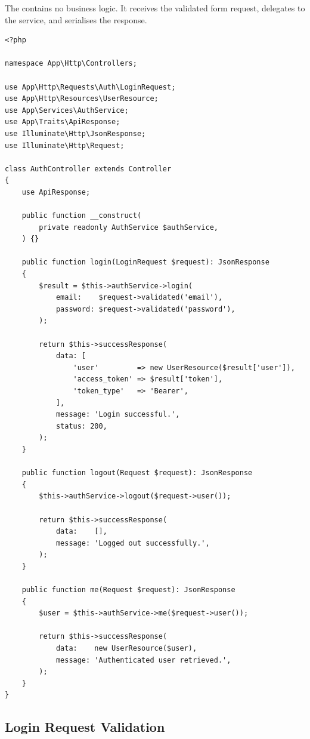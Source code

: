 The  contains no business logic. It receives
the validated form request, delegates to the service, and serialises the
response.

\begin{lstlisting}[style=php, caption={\texttt{app/Http/Controllers/AuthController.php}
  --- Thin controller delegating entirely to \phpclass{AuthService}.}]
<?php

namespace App\Http\Controllers;

use App\Http\Requests\Auth\LoginRequest;
use App\Http\Resources\UserResource;
use App\Services\AuthService;
use App\Traits\ApiResponse;
use Illuminate\Http\JsonResponse;
use Illuminate\Http\Request;

class AuthController extends Controller
{
    use ApiResponse;

    public function __construct(
        private readonly AuthService $authService,
    ) {}

    public function login(LoginRequest $request): JsonResponse
    {
        $result = $this->authService->login(
            email:    $request->validated('email'),
            password: $request->validated('password'),
        );

        return $this->successResponse(
            data: [
                'user'         => new UserResource($result['user']),
                'access_token' => $result['token'],
                'token_type'   => 'Bearer',
            ],
            message: 'Login successful.',
            status: 200,
        );
    }

    public function logout(Request $request): JsonResponse
    {
        $this->authService->logout($request->user());

        return $this->successResponse(
            data:    [],
            message: 'Logged out successfully.',
        );
    }

    public function me(Request $request): JsonResponse
    {
        $user = $this->authService->me($request->user());

        return $this->successResponse(
            data:    new UserResource($user),
            message: 'Authenticated user retrieved.',
        );
    }
}
\end{lstlisting}

\subsection{Login Request Validation}

